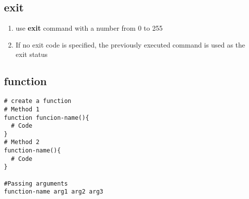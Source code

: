 \documentclass[12pt,a4paper]{article}
\begin{document}
\subsection{exit}
\begin{enumerate}
	\item use \textbf{exit} command with a number from 0 to 255
	\item If no exit code is specified, the previously executed command is used as the exit status
\end{enumerate}

\subsection{function}
\begin{footnotesize}
\begin{verbatim}
# create a function
# Method 1
function funcion-name(){
  # Code
}
# Method 2
function-name(){
  # Code
}

#Passing arguments
function-name arg1 arg2 arg3
\end{verbatim}

\end{footnotesize}
\end{document}

